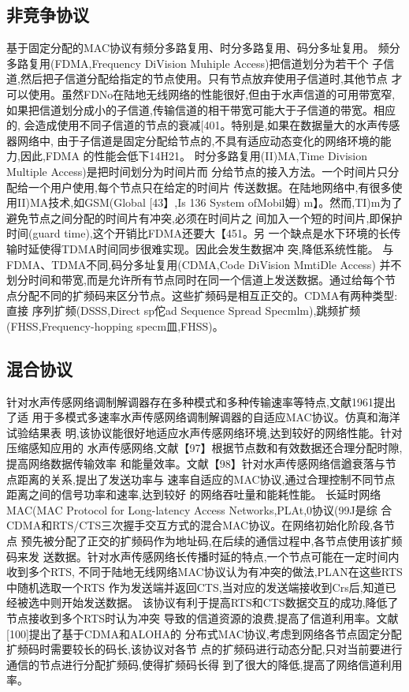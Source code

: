 \subsection{非竞争协议}
基于固定分配的MAC协议有频分多路复用、时分多路复用、码分多址复用。
频分多路复用(FDMA,Frequency
DiVision
Muhiple Access)把信道划分为若干个
子信道,然后把子信道分配给指定的节点使用。只有节点放弃使用子信道时,其他节点
才可以使用。虽然FDNo在陆地无线网络的性能很好,但由于水声信道的可用带宽窄,
如果把信道划分成小的子信道,传输信道的相干带宽可能大于子信道的带宽。相应的,
会造成使用不同子信道的节点的衰减[401。特别是,如果在数据量大的水声传感器网络中,
由于子信道是固定分配给节点的,不具有适应动态变化的网络环境的能力,因此,FDMA
的性能会低下14H21。
时分多路复用(II)MA,Time
Division
Multiple Access)是把时间划分为时间片而
分给节点的接入方法。一个时间片只分配给一个用户使用,每个节点只在给定的时间片
传送数据。在陆地网络中,有很多使用II)MA技术,如GSM(Global
[43】,Is 136
System
ofMobil姆)
m】。然而,TI)m为了避免节点之间分配的时间片有冲突,必须在时间片之
间加入一个短的时间片,即保护时间(guard time),这个开销比FDMA还要大【451。另
一个缺点是水下环境的长传输时延使得TDMA时间同步很难实现。因此会发生数据冲
突,降低系统性能。
与FDMA、TDMA不同,码分多址复用(CDMA,Code
DiVision
MmtiDle Access)
并不划分时间和带宽,而是允许所有节点同时在同一个信道上发送数据。通过给每个节
点分配不同的扩频码来区分节点。这些扩频码是相互正交的。CDMA有两种类型:直接
序列扩频(DSSS,Direct
sp佗ad
Sequence Spread
Specmlm),跳频扩频(FHSS,Frequency-hopping
specm皿,FHSS)。

\subsection{混合协议}
针对水声传感网络调制解调器存在多种模式和多种传输速率等特点,文献1961提出了适
用于多模式多速率水声传感网络调制解调器的自适应MAC协议。仿真和海洋试验结果表
明,该协议能很好地适应水声传感网络环境,达到较好的网络性能。针对压缩感知应用的
水声传感网络,文献【97】根据节点数和有效数据还合理分配时隙,提高网络数据传输效率
和能量效率。文献【98】针对水声传感网络信遒衰落与节点距离的关系,提出了发送功率与
速率自适应的MAC协议,通过合理控制不同节点距离之间的信号功率和速率,达到较好
的网络吞吐量和能耗性能。
长延时网络MAC(MAC
Protocol for Long-latency Access
Networks,PLAt,0协议(99J是综
合CDMA和RTS/CTS三次握手交互方式的混合MAC协议。在网络初始化阶段,各节点
预先被分配了正交的扩频码作为地址码,在后续的通信过程中,各节点使用该扩频码来发
送数据。针对水声传感网络长传播时延的特点,一个节点可能在一定时间内收到多个RTS,
不同于陆地无线网络MAC协议认为有冲突的做法,PLAN在这些RTS中随机选取一个RTS
作为发送端并返回CTS,当对应的发送端接收到Crs后,知道已经被选中则开始发送数据。
该协议有利于提高RTS和CTS数据交互的成功,降低了节点接收到多个RTS时认为冲突
导致的信道资源的浪费,提高了信道利用率。文献[100]提出了基于CDMA和ALOHA的
分布式MAC协议,考虑到网络各节点固定分配扩频码时需要较长的码长,该协议对各节
点的扩频码进行动态分配,只对当前要进行通信的节点进行分配扩频码,使得扩频码长得
到了很大的降低,提高了网络信道利用率。

